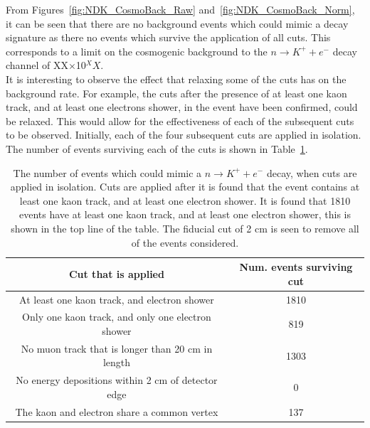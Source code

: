 From Figures~\ref{fig:NDK_CosmoBack_Raw} and~\ref{fig:NDK_CosmoBack_Norm}, it can be seen that there are no background events which could mimic a decay signature as there no events which survive the application of all cuts. This corresponds to a limit on the cosmogenic background to the $n \rightarrow K^{+} + e^{-}$ decay channel of XX$\times$10$^XX$. \\

It is interesting to observe the effect that relaxing some of the cuts has on the background rate. For example, the cuts after the presence of at least one kaon track, and at least one electrons shower, in the event have been confirmed, could be relaxed. This would allow for the effectiveness of each of the subsequent cuts to be observed. Initially, each of the four subsequent cuts are applied in isolation. The number of events surviving each of the cuts is shown in Table~\ref{tab:NDK_CosmoBack_EachCut}. \\

\begin{table}[h!]
  \caption[The number of events which could mimic a $n \rightarrow K^{+} + e^{-}$ decay, when cuts are applied in isolation]
          {The number of events which could mimic a $n \rightarrow K^{+} + e^{-}$ decay, when cuts are applied in isolation. Cuts are applied after it is found that the event contains at least one kaon track, and at least one electron shower. It is found that 1810 events have at least one kaon track, and at least one electron shower, this is shown in the top line of the table. The fiducial cut of 2 cm is seen to remove all of the events considered.}
  \centering
  \label{tab:NDK_CosmoBack_EachCut}
  \begin{tabular}{c c}
    \toprule
        {Cut that is applied}                                & {Num. events surviving cut} \\
        \midrule
        At least one kaon track, and electron shower         & 1810                                \\

        Only one kaon track, and only one electron shower    & 819                                 \\

        No muon track that is longer than 20 cm in length    & 1303                                \\

        No energy depositions within 2 cm of detector edge   & 0                                   \\

        The kaon and electron share a common vertex          & 137                                 \\
        \bottomrule
  \end{tabular}
\end{table}

